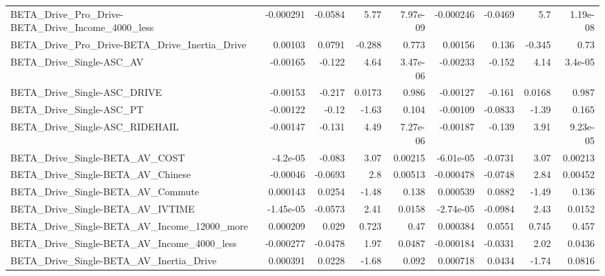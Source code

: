 \begin{tabular}{lrrrrrrrr}
BETA\_Drive\_Pro\_Drive-BETA\_Drive\_Income\_4000\_less   &   -0.000291 &      -0.0584 &     5.77 & 7.97e-09 &  -0.000246 &     -0.0469 &          5.7 &      1.19e-08 \\
BETA\_Drive\_Pro\_Drive-BETA\_Drive\_Inertia\_Drive      &     0.00103 &       0.0791 &   -0.288 &    0.773 &    0.00156 &       0.136 &       -0.345 &          0.73 \\
BETA\_Drive\_Single-ASC\_AV                           &    -0.00165 &       -0.122 &     4.64 & 3.47e-06 &   -0.00233 &      -0.152 &         4.14 &       3.4e-05 \\
BETA\_Drive\_Single-ASC\_DRIVE                        &    -0.00153 &       -0.217 &   0.0173 &    0.986 &   -0.00127 &      -0.161 &       0.0168 &         0.987 \\
BETA\_Drive\_Single-ASC\_PT                           &    -0.00122 &        -0.12 &    -1.63 &    0.104 &   -0.00109 &     -0.0833 &        -1.39 &         0.165 \\
BETA\_Drive\_Single-ASC\_RIDEHAIL                     &    -0.00147 &       -0.131 &     4.49 & 7.27e-06 &   -0.00187 &      -0.139 &         3.91 &      9.23e-05 \\
BETA\_Drive\_Single-BETA\_AV\_COST                     &    -4.2e-05 &       -0.083 &     3.07 &  0.00215 &  -6.01e-05 &     -0.0731 &         3.07 &       0.00213 \\
BETA\_Drive\_Single-BETA\_AV\_Chinese                  &    -0.00046 &      -0.0693 &      2.8 &  0.00513 &  -0.000478 &     -0.0748 &         2.84 &       0.00452 \\
BETA\_Drive\_Single-BETA\_AV\_Commute                  &    0.000143 &       0.0254 &    -1.48 &    0.138 &   0.000539 &      0.0882 &        -1.49 &         0.136 \\
BETA\_Drive\_Single-BETA\_AV\_IVTIME                   &   -1.45e-05 &      -0.0573 &     2.41 &   0.0158 &  -2.74e-05 &     -0.0984 &         2.43 &        0.0152 \\
BETA\_Drive\_Single-BETA\_AV\_Income\_12000\_more        &    0.000209 &        0.029 &    0.723 &     0.47 &   0.000384 &      0.0551 &        0.745 &         0.457 \\
BETA\_Drive\_Single-BETA\_AV\_Income\_4000\_less         &   -0.000277 &      -0.0478 &     1.97 &   0.0487 &  -0.000184 &     -0.0331 &         2.02 &        0.0436 \\
BETA\_Drive\_Single-BETA\_AV\_Inertia\_Drive            &    0.000391 &       0.0228 &    -1.68 &    0.092 &   0.000718 &      0.0434 &        -1.74 &        0.0816 \\

\end{tabular}
